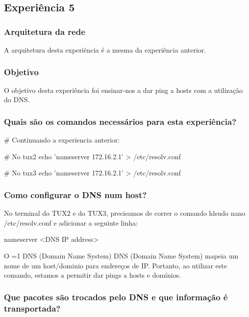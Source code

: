 \documentclass[11pt,a4paper,twocolumn]{article}
\newcommand{\hl}[2][1]{%
  \ifnum#1=1\relax
    \textcolor{text-hl1}{#2}%
  \else
    \textcolor{text-hl2}{#2}%
  \fi
}
\begin{document}
\subsection{Experiência 5}

\subsubsection{Arquitetura da rede}

A arquitetura desta experiência é a mesma da experiência anterior.

\subsubsection{Objetivo}

O objetivo desta experiência foi ensinar-nos a dar ping a hosts com a utilização do DNS.

\subsubsection{Quais são os comandos necessários para esta experiência?}

\begin{bash-darktheme}
    # Continuando a experiencia anterior:

    # No tux2
    echo 'nameserver 172.16.2.1' > /etc/resolv.conf
    
    # No tux3
    echo 'nameserver 172.16.2.1' > /etc/resolv.conf

\end{bash-darktheme}

\subsubsection{ Como configurar o DNS num host?}

No terminal do TUX2 e do TUX3, precisamos de correr o comando hl{sudo nano /etc/resolv.conf} e adicionar a seguinte linha:

\begin{bash-darktheme}
    nameserver <DNS IP address>
\end{bash-darktheme}

O \hl{DNS (Domain Name System)} mapeia um nome de um host/dominio para endereços de IP. Portanto, ao utilizar este comando, estamos a permitir dar pings a hosts e domínios.

\subsubsection{ Que pacotes são trocados pelo DNS e que informação é transportada?}
\end{document}
